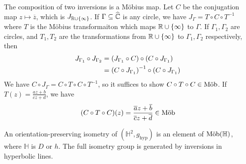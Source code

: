 \begin{remark}
	The composition of two inversions is a M\"obius map.
	Let \( C \) be the conjugation map \( z \mapsto \overline z \), which is \( J_{\mathbb R \cup \qty{\infty}} \).
	If \( \Gamma \subseteq \widehat{\mathbb C} \) is any circle, we have \( J_\Gamma = T \circ C \circ T^{-1} \) where \( T \) is the M\"obius transformaiton which maps \( \mathbb R \cup \qty{\infty} \) to \( \Gamma \).
	If \( \Gamma_1, \Gamma_2 \) are circles, and \( T_1, T_2 \) are the transformations from \( \mathbb R \cup \qty{\infty} \) to \( \Gamma_1, \Gamma_2 \) respectively, then
	\begin{align*}
		J_{\Gamma_1} \circ J_{\Gamma_2} &= \qty(J_{\Gamma_1} \circ C) \circ \qty(C \circ J_{\Gamma_1}) \\
		&= \qty(C \circ J_{\Gamma_1})^{-1} \circ \qty(C \circ J_{\Gamma_1})
	\end{align*}
	We have \( C \circ J_\Gamma = C \circ T \circ C \circ T^{-1} \), so it suffices to show \( C \circ T \circ C \in \text{M\"ob} \).
	If \( T(z) = \frac{az+b}{cz+d} \), we have
	\[ (C \circ T \circ C)(z) = \frac{\overline a z + \overline b}{\overline c z + \overline d} \in \text{M\"ob} \]
\end{remark}
\begin{lemma}
	An orientation-preserving isometry of \( (\mathbb H^2, g_{\text{hyp}}) \) is an element of \( \text{M\"ob}(\mathbb H) \), where \( \mathbb H \) is \( D \) or \( h \).
	The full isometry group is generated by inversions in hyperbolic lines.
\end{lemma}
